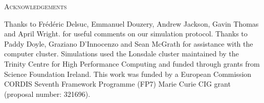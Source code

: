 \documentclass[12pt,letterpaper]{article}
\renewcommand{\section}[1]{%
\bigskip
\begin{center}
\begin{Large}
\normalfont\scshape #1
\medskip
\end{Large}
\end{center}}
\begin{document}
\section{Acknowledgements}
Thanks to Fr\'{e}d\'{e}ric Delsuc, Emmanuel Douzery, Andrew Jackson, Gavin Thomas and April Wright. %
for useful comments on our simulation protocol.
Thanks to Paddy Doyle, Graziano D'Innocenzo and Sean McGrath for assistance with the computer cluster. Simulations used the Lonsdale cluster maintained by the Trinity Centre for High Performance Computing and funded through grants from Science Foundation Ireland. This work was funded by a European Commission CORDIS Seventh Framework Programme (FP7) Marie Curie CIG grant (proposal number: 321696).




%
%


%    

\end{document}
